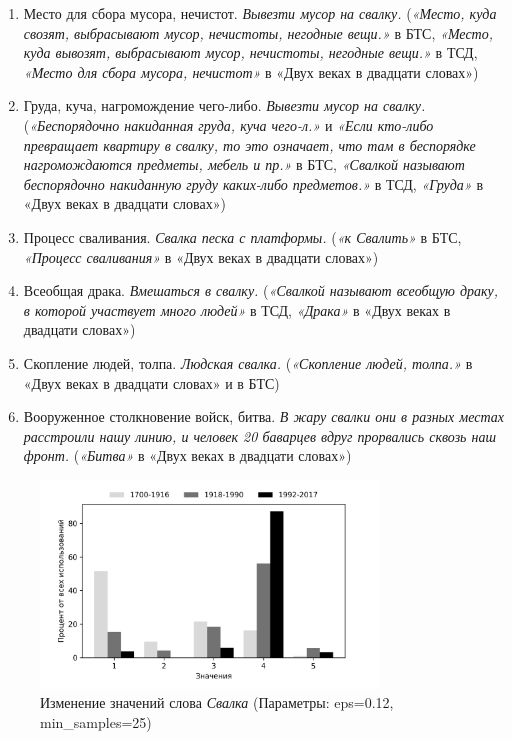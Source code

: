 \begin{enumerate}
    \item Место для сбора мусора, нечистот. \textit{Вывезти мусор на свалку.}
(\textit{«Место, куда свозят, выбрасывают мусор, нечистоты, негодные вещи.»} в БТС,
\textit{«Место, куда вывозят, выбрасывают мусор, нечистоты, негодные вещи.»} в ТСД,
\textit{«Место для сбора мусора, нечистот»} в «Двух веках в двадцати словах»)
    \item Груда, куча, нагромождение чего-либо. \textit{Вывезти мусор на свалку.}
(\textit{«Беспорядочно накиданная груда, куча чего-л.»} и
\textit{«Если кто-либо превращает квартиру в свалку, то это означает, что там в беспорядке нагромождаются предметы, мебель и пр.»} в БТС,
\textit{«Свалкой называют беспорядочно накиданную груду каких-либо предметов.»} в ТСД,
\textit{«Груда»} в «Двух веках в двадцати словах»)
    \item Процесс сваливания. \textit{Свалка песка с платформы.}
(\textit{«к Свалить»} в БТС,
\textit{«Процесс сваливания»} в «Двух веках в двадцати словах»)
    \item Всеобщая драка. \textit{Вмешаться в свалку.}
(\textit{«Свалкой называют всеобщую драку, в которой участвует много людей»} в ТСД,
\textit{«Драка»} в «Двух веках в двадцати словах»)
    \item Скопление людей, толпа. \textit{Людская свалка.}
(\textit{«Скопление людей, толпа.»} в «Двух веках в двадцати словах» и в БТС)
    \item Вооруженное столкновение войск, битва. \textit{В жару свалки они в разных местах расстроили нашу линию, и человек 20 баварцев вдруг прорвались сквозь наш фронт.}
(\textit{«Битва»} в «Двух веках в двадцати словах»)
\end{enumerate}

\begin{figure}[H]
	\centering
	\includegraphics[width=0.8\textwidth]{img/visualizations/svalka_minimal}
	\caption{Изменение значений слова \textit{Свалка} (Параметры: eps=0.12, min\_samples=25)}
	\label{fig:Свалка}
\end{figure}

